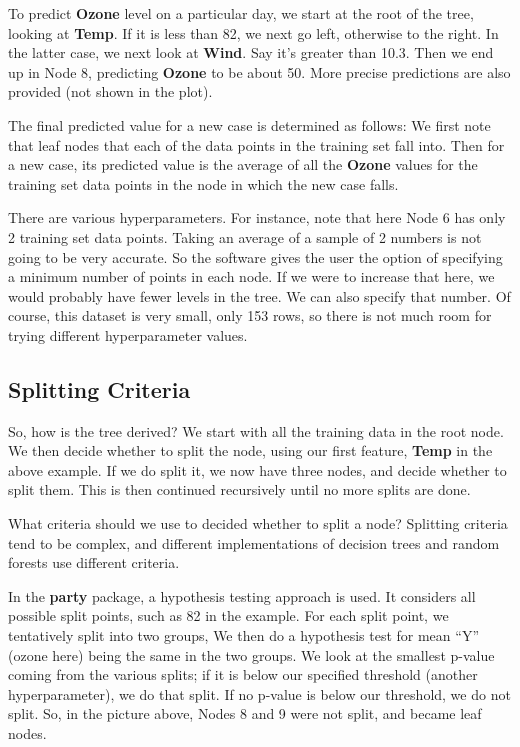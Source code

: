To predict \textbf{Ozone} level on a particular day, we start at the
root of the tree, looking at \textbf{Temp}.  If it is less than 82, we
next go left, otherwise to the right.  In the latter case, we next look
at \textbf{Wind}.  Say it's greater than 10.3.  Then we end up in Node
8, predicting \textbf{Ozone} to be about 50.  More precise predictions
are also provided (not shown in the plot).

The final predicted value for a new case is determined as follows:  We
first note that leaf nodes that each of the data points in the training set
fall into.  Then for a new case, its predicted value is the average of
all the \textbf{Ozone} values for the training set data points in the
node in which the new case falls.

There are various hyperparameters.  For instance, note that here Node 6
has only 2 training set data points.  Taking an average of a sample of 2
numbers is not going to be very accurate.  So the software gives the
user the option of specifying a minimum number of points in each node.
If we were to increase that here, we would probably have fewer levels in
the tree.  We can also specify that number.  Of course, this dataset is
very small, only 153 rows, so there is not much room for trying
different hyperparameter values.

\subsection{Splitting Criteria}

So, how is the tree derived?  We start with all the training data in the
root node.  We then decide whether to split the node, using our first
feature, \textbf{Temp} in the above example.  If we do split it, we now
have three nodes, and decide whether to split them.  This is then
continued recursively until no more splits are done.

What criteria should we use to decided whether to split a node?
Splitting criteria tend to be complex, and different implementations of
decision trees and random forests use different criteria.

In the \textbf{party} package, a hypothesis testing approach is used.
It considers all possible split points, such as 82 in the example.  For
each split point, we tentatively split into two groups,  We then do a
hypothesis test for mean ``Y'' (ozone here) being the same in the two
groups.  We look at the smallest p-value coming from the various splits;
if it is below our specified threshold (another hyperparameter), we do
that split.  If no p-value is below our threshold, we do not split.
So, in the picture above, Nodes 8 and 9 were not split, and became leaf
nodes.


